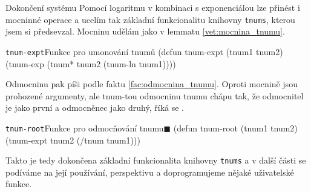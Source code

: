 \begin{myremarkbez}{Dokončení systému}
Pomocí logaritmu v kombinaci s exponenciálou lze přinést i mocninné operace a ucelím tak základní funkcionalitu knihovny \texttt{tnums}, kterou jsem si předsevzal. Mocninu udělám jako v lemmatu \ref{vet:mocnina_tnumu}.
\begin{lispcode}{\texttt{tnum-expt}}{Funkce pro umonování tnumů}
(\textcolor{funkcionalni}{defun} \textcolor{pojmenovan}{tnum-expt} (tnum1 tnum2)
  (\textcolor{moje}{tnum-exp} (\textcolor{moje}{tnum*} tnum2 (\textcolor{moje}{tnum-ln} tnum1))))
\end{lispcode}

Odmocninu pak píši podle faktu \ref{fac:odmocnina_tnumu}. Oproti mocnině jsou prohozené argumenty, ale tnum-tou odmocninu tnumu chápu tak, že odmocnitel je jako první a odmocněnec jako druhý, říká se .

\begin{lispcode}{\texttt{tnum-root}}{Funkce pro odmocňování tnumu\hfill$\blacksquare$}
(\textcolor{funkcionalni}{defun} \textcolor{pojmenovan}{tnum-root} (tnum1 tnum2)
  (\textcolor{moje}{tnum-expt} tnum2 (\textcolor{moje}{/tnum} tnum1)))
\end{lispcode}
\end{myremarkbez}

Takto je tedy dokončena základní funkcionalita knihovny \texttt{tnums} a v další části se podíváme na její používání, perspektivu a doprogramujeme nějaké uživatelské funkce.